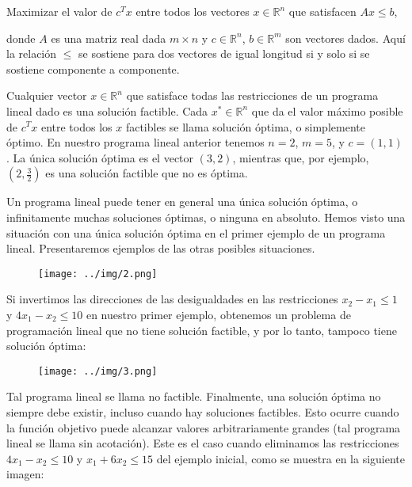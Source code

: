 \documentclass{article}
\begin{document}
Maximizar el valor de \( c^T x \)
entre todos los vectores \( x \in \mathbb{R}^n \) que satisfacen \( Ax \leq b \),

donde \( A \) es una matriz real dada \( m \times n \) y \( c \in \mathbb{R}^n \), \( b \in \mathbb{R}^m \) son vectores dados. Aquí la relación \(\leq\) se sostiene para dos vectores de igual longitud si y solo si se sostiene componente a componente.

Cualquier vector \( x \in \mathbb{R}^n \) que satisface todas las restricciones de un programa lineal dado es una solución factible. Cada \( x^* \in \mathbb{R}^n \) que da el valor máximo posible de \( c^T x \) entre todos los \( x \) factibles se llama solución óptima, o simplemente óptimo. En nuestro programa lineal anterior tenemos \( n = 2 \), \( m = 5 \), y \( c = (1, 1) \). La única solución óptima es el vector \( (3, 2) \), mientras que, por ejemplo, \( (2, \frac{3}{2}) \) es una solución factible que no es óptima.

Un programa lineal puede tener en general una única solución óptima, o infinitamente muchas soluciones óptimas, o ninguna en absoluto. Hemos visto una situación con una única solución óptima en el primer ejemplo de un programa lineal. Presentaremos ejemplos de las otras posibles situaciones.
\begin{figure}[H] %
\centering %
\texttt{[image: ../img/2.png]} %
\label{fig:imagen} %
\end{figure}

Si invertimos las direcciones de las desigualdades en las restricciones \( x_2 - x_1 \leq 1 \) y \( 4x_1 - x_2 \leq 10 \) en nuestro primer ejemplo, obtenemos un problema de programación lineal que no tiene solución factible, y por lo tanto, tampoco tiene solución óptima:
\begin{figure}[H] %
\centering %
\texttt{[image: ../img/3.png]} %
\label{fig:imagen} %
\end{figure}

Tal programa lineal se llama no factible. Finalmente, una solución óptima no siempre debe existir, incluso cuando hay soluciones factibles. Esto ocurre cuando la función objetivo puede alcanzar valores arbitrariamente grandes (tal programa lineal se llama sin acotación). Este es el caso cuando eliminamos las restricciones \(4x_1 - x_2 \leq 10\) y \(x_1 + 6x_2 \leq 15\) del ejemplo inicial, como se muestra en la siguiente imagen:
\end{document}
